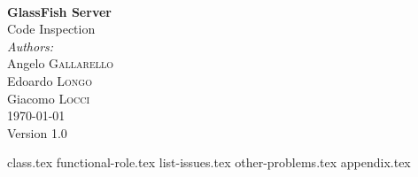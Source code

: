 \documentclass[12pt, a4paper]{article}
\begin{document}
\begin{titlepage}
 


\HRule \\[0.4cm]
{ \huge \bfseries GlassFish Server} \\[0.2cm]%
	{\Large Code Inspection}
\HRule \\[1.5cm]
 


\large \emph{Authors:}\\
Angelo  \textsc{Gallarello}\\
Edoardo  \textsc{Longo}\\
Giacomo  \textsc{Locci}\\[1.5cm]


{\large \today \\Version 1.0} %



\vfill %

\end{titlepage}

\newpage

\tableofcontents

\newpage



\newpage
{class.tex}
{functional-role.tex}
\newpage
{list-issues.tex}
\newpage
{other-problems.tex}
\newpage
{appendix.tex}
\end{document}
